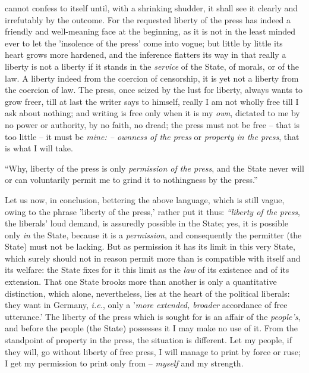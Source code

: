\documentclass[12pt,a4paper]{book}
\begin{document}
cannot confess to itself until, with a shrinking shudder, it shall see it 
clearly and irrefutably by the outcome. For the requested liberty of the press 
has indeed a friendly and well-meaning face at the beginning, as it is not in 
the least minded ever to let the 'insolence of the press' come into vogue; but 
little by little its heart grows more hardened, and the inference flatters its 
way in that really a liberty is not a liberty if it stands in the 
\textit{service} of the State, of morals, or of the law. A liberty indeed from 
the coercion of censorship, it is yet not a liberty from the coercion of law. 
The press, once seized by the lust for liberty, always wants to grow freer, 
till at last the writer says to himself, really I am not wholly free till I 
ask about nothing; and writing is free only when it is my \textit{own}, 
dictated to me by no power or authority, by no faith, no dread; the press must 
not be free -- that is too little -- it must be \textit{mine: -- ownness of 
the press} or \textit{property in the press}, that is what I will take.

``Why, liberty of the press is only \textit{permission of the press}, and the 
State never will or can voluntarily permit me to grind it to nothingness by 
the press.''

Let us now, in conclusion, bettering the above language, which is still vague, 
owing to the phrase 'liberty of the press,' rather put it thus: 
\textit{``liberty of the press}, the liberals' loud demand, is assuredly 
possible in the State; yes, it is possible only \textit{in} the State, because 
it is a \textit{permission}, and consequently the permitter (the State) must 
not be lacking. But as permission it has its limit in this very State, which 
surely should not in reason permit more than is compatible with itself and its 
welfare: the State fixes for it this limit as the \textit{law} of its 
existence and of its extension. That one State brooks more than another is 
only a quantitative distinction, which alone, nevertheless, lies at the heart 
of the political liberals: they want in Germany, \textit{i.e.}, only a 
'\textit{more extended, broader} accordance of free utterance.' The liberty of 
the press which is sought for is an affair of the \textit{people's}, and 
before the people (the State) possesses it I may make no use of it. From the 
standpoint of property in the press, the situation is different. Let my 
people, if they will, go without liberty of free press, I will manage to print 
by force or ruse; I get my permission to print only from -- \textit{myself} 
and my strength.
\end{document}
